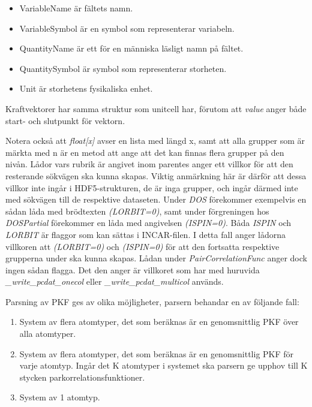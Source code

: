 \documentclass[10pt,oneside,swedish]{article}
\providecommand{\tightlist}{%
  \setlength{\itemsep}{0pt}\setlength{\parskip}{0pt}}
\begin{document}
\begin{itemize}
\tightlist
\item
  VariableName är fältets namn.
\item
  VariableSymbol är en symbol som representerar variabeln.
\item
  QuantityName är ett för en människa läsligt namn på fältet.
\item
  QuantitySymbol är symbol som representerar storheten.
\item
  Unit är storhetens fysikaliska enhet.
\end{itemize}

Kraftvektorer har samma struktur som unitcell har, förutom att \textit{value} anger både start- och slutpunkt för vektorn. 

Notera också att \emph{float{[}x{]}} avser en lista med längd x, samt
att alla grupper som är märkta med n är en metod att ange att det kan
finnas flera grupper på den nivån. Lådor vars rubrik är angivet inom
parentes anger ett villkor för att den resterande sökvägen ska kunna
skapas. Viktig anmärkning här är därför att dessa villkor inte ingår i
HDF5-strukturen, de är inga grupper, och ingår därmed inte med sökvägen
till de respektive dataseten. Under \emph{DOS} förekommer exempelvis en
sådan låda med brödtexten \emph{(LORBIT=0)}, samt under förgreningen hos
\emph{DOSPartial} förekommer en låda med angivelsen \emph{(ISPIN=0)}.
Båda \emph{ISPIN} och \emph{LORBIT} är flaggor som kan sättas i
INCAR-filen. I detta fall anger lådorna villkoren att \emph{(LORBIT=0)}
och \emph{(ISPIN=0)} för att den fortsatta respektive grupperna under
ska kunna skapas. Lådan under \emph{PairCorrelationFunc} anger dock
ingen sådan flagga. Det den anger är villkoret som har med huruvida
\emph{\_write\_pcdat\_onecol} eller \emph{\_write\_pcdat\_multicol}
används.

Parsning av PKF ges av olika möjligheter, parsern behandar en av
följande fall:

\begin{enumerate}
\tightlist
\item
  System av flera atomtyper, det som beräknas är en genomsnittlig PKF
  över alla atomtyper.
\item
  System av flera atomtyper, det som beräknas är en genomsnittlig PKF
  för varje atomtyp. Ingår det K atomtyper i systemet ska parsern ge
  upphov till K stycken parkorrelationsfunktioner.
\item
  System av 1 atomtyp.
\end{enumerate}
\end{document}
